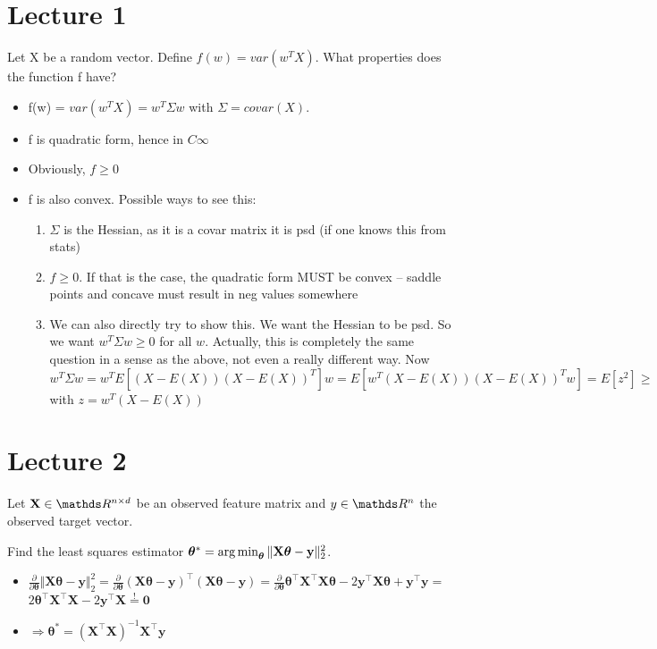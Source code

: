 \documentclass[a4paper]{article}
\begin{document}






\section{Lecture 1}
Let X be a random vector. Define $f(w) = var(w^T X)$. What properties does the function f have?
\begin{itemize}
    \item f(w) = $var(w^T X) = w^T \Sigma w$ with $\Sigma = covar(X)$. 
    \item f is quadratic form, hence in $C\infty$
    \item Obviously, $f \geq 0$
    \item f is also convex. Possible ways to see this:
\begin{enumerate}
    \item $\Sigma$ is the Hessian, as it is a covar matrix it is psd (if one knows this from stats)
    \item $f \geq 0$. If that is the case, the quadratic form MUST be convex -- saddle points and concave must result in neg values somewhere
    \item We can also directly try to show this. We want the Hessian to be psd. So we want $w^T \Sigma w \geq 0$ for all $w$. Actually, this is completely the same question in a sense as the above, not even a really different way. Now
    $$w^T \Sigma w = w^T E[ (X - E(X)) (X - E(X))^T] w = 
    E[ w^T (X - E(X)) (X - E(X))^T w] = E[z^2] \geq 
    $$
    with $z =  w^T (X - E(X))$
\end{enumerate}
    
\end{itemize}
\section{Lecture 2}

Let $\mathbf{X} \in \R^{n \times d}$ be an observed feature matrix and $y \in \R^n$ the observed target vector.

Find the least squares estimator $\bm{\theta}^* =  \operatorname{arg\,min}_{\bm{\theta}} \Vert \mathbf{X} \bm{\theta} - \mathbf{y}\Vert^2_2$.
\begin{itemize}
    \item $\frac{\partial}{\partial  \bm{\theta}} \Vert \mathbf{X} \bm{\theta} - \mathbf{y}\Vert^2_2 = \frac{\partial}{\partial  \bm{\theta}} (\mathbf{X} \bm{\theta} - \mathbf{y})^\top (\mathbf{X} \bm{\theta} - \mathbf{y}) = \frac{\partial}{\partial  \bm{\theta}} \bm{\theta}^\top\mathbf{X}^\top \mathbf{X} \bm{\theta} - 2\mathbf{y}^\top\mathbf{X} \bm{\theta} + \mathbf{y}^\top\mathbf{y} =$ \\ $2\bm{\theta}^\top\mathbf{X}^\top \mathbf{X} -2\mathbf{y}^\top\mathbf{X} \overset{!}{=} \mathbf{0}$ 
    \item $\Rightarrow \bm{\theta}^* = (\mathbf{X}^\top \mathbf{X})^{-1}\mathbf{X}^\top \mathbf{y}$
\end{itemize}
\end{document}
